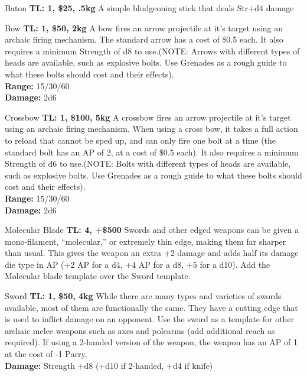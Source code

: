 \begin{multicols}{2}

\begin{genericsection}{Baton}
\textbf{TL: 1, \$25, .5kg}
A simple bludgeoning stick that deals Str+d4 damage
\end{genericsection}

\begin{genericsection}{Bow}
\textbf{TL: 1, \$50, 2kg}
A bow fires an arrow projectile at it's target using an archaic firing mechanism. The standard arrow has a cost of \$0.5 each. It also requires a minimum Strength of d8 to use.(NOTE: Arrows with different types of heads are available, such as explosive bolts. Use Grenades as a rough guide to what these bolts should cost and their effects).\\
\textbf{Range:} 15/30/60\\
\textbf{Damage:} 2d6
\end{genericsection}

\begin{genericsection}{Crossbow}
\textbf{TL: 1, \$100, 5kg}
A crossbow fires an arrow projectile at it's target using an archaic firing mechanism. When using a cross bow, it takes a full action to reload that cannot be sped up, and can only fire one bolt at a time (the standard bolt has an AP of 2, at a cost of \$0.5 each). It also requires a minimum Strength of d6 to use.(NOTE: Bolts with different types of heads are available, such as explosive bolts. Use Grenades as a rough guide to what these bolts should cost and their effects).\\
\textbf{Range:} 15/30/60\\
\textbf{Damage:} 2d6
\end{genericsection}

\begin{genericsection}{Molecular Blade}
\textbf{TL: 4, +\$500}
Swords and other edged weapons can be given a mono-filament, “molecular,” or extremely thin edge, making them far sharper than usual. This gives the weapon an extra +2 damage and adds half its damage die type in AP (+2 AP for a d4, +4 AP for a d8, +5 for a d10). Add the Molecular blade template over the Sword template.
\end{genericsection}

\begin{genericsection}{Sword}
\textbf{TL: 1, \$50, 4kg}
While there are many types and varieties of swords available, most of them are functionally the same. They have a cutting edge that is used to inflict damage on an opponent. Use the sword as a template for other archaic melee weapons such as axes and polearms (add additional reach as required). If using a 2-handed version of the weapon, the weapon has an AP of 1 at the cost of -1 Parry.\\
\textbf{Damage:} Strength +d8 (+d10 if 2-handed, +d4 if knife)
\end{genericsection}

\end{multicols}

